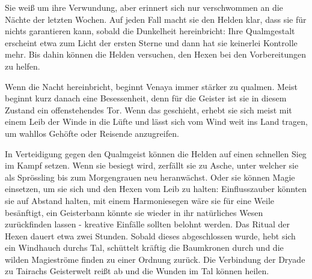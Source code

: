Sie weiß um ihre Verwundung, aber erinnert sich nur verschwommen an die Nächte der letzten Wochen. Auf jeden Fall macht sie den Helden klar, dass sie für nichts garantieren kann, sobald die Dunkelheit hereinbricht: Ihre Qualmgestalt erscheint etwa zum Licht der ersten Sterne und dann hat sie keinerlei Kontrolle mehr. Bis dahin können die Helden versuchen, den Hexen bei den Vorbereitungen zu helfen.


Wenn die Nacht hereinbricht, beginnt Venaya immer stärker zu qualmen. Meist beginnt kurz danach eine Besessenheit, denn für die Geister ist sie in diesem Zustand ein offenstehendes Tor. Wenn das geschieht, erhebt sie sich meist mit einem Leib der Winde in die Lüfte und lässt sich vom Wind weit ins Land tragen, um wahllos Gehöfte oder Reisende anzugreifen.


In Verteidigung gegen den Qualmgeist können die Helden auf einen schnellen Sieg im Kampf setzen. Wenn sie besiegt wird, zerfällt sie zu Asche, unter welcher sie als Sprössling bis zum Morgengrauen neu heranwächst.
Oder sie können Magie einsetzen, um sie sich und den Hexen vom Leib zu halten: Einflusszauber könnten sie auf Abstand halten, mit einem Harmoniesegen wäre sie für eine Weile besänftigt, ein Geisterbann könnte sie wieder in ihr natürliches Wesen zurückfinden lassen - kreative Einfälle sollten belohnt werden.
Das Ritual der Hexen dauert etwa zwei Stunden. Sobald dieses abgeschlossen wurde, hebt sich ein Windhauch durchs Tal, schüttelt kräftig die Baumkronen durch und die wilden Magieströme finden zu einer Ordnung zurück. Die Verbindung der Dryade zu Tairachs Geisterwelt reißt ab und die Wunden im Tal können heilen.



